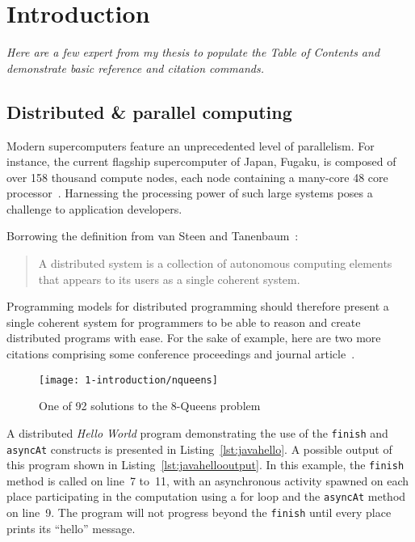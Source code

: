 \chapter{Introduction}
\label{cha:introduction}

\textit{Here are a few expert from my thesis to populate the Table of Contents and demonstrate basic reference and citation commands.}

\section{Distributed \& parallel computing}

Modern supercomputers feature an unprecedented level of parallelism.
For instance, the current flagship supercomputer of Japan, Fugaku, is composed of over 158 thousand compute nodes, each node containing a many-core 48 core processor~\cite{fugaku}.
Harnessing the processing power of such large systems poses a challenge to application developers.

Borrowing the definition from van Steen and Tanenbaum~\cite{distributedsystems}:
\begin{quote}
A distributed system is a collection of autonomous computing elements that appears to its users as a single coherent system.
\end{quote}
Programming models for distributed programming should therefore present a single coherent system for programmers to be able to reason and create distributed programs with ease.
For the sake of example, here are two more citations comprising some conference proceedings and journal article~\cite{habanerox10,resilientx10}.

\begin{figure}
	\centering
\texttt{[image: 1-introduction/nqueens]}
\caption{One of 92 solutions to the 8-Queens problem}
\label{fig:nqueenssolution}
\end{figure}

A distributed \emph{Hello World} program demonstrating the use of the \lstinline|finish| and \lstinline|asyncAt| constructs is presented in Listing~\ref{lst:javahello}.
A possible output of this program shown in Listing~\ref{lst:javahellooutput}.
In this example, the \verb|finish| method is called on line~7 to~11, with an asynchronous activity spawned on each place participating in the computation using a for loop and the \lstinline|asyncAt| method on line~9. 
The program will not progress beyond the \lstinline|finish| until every place prints its ``hello'' message.

